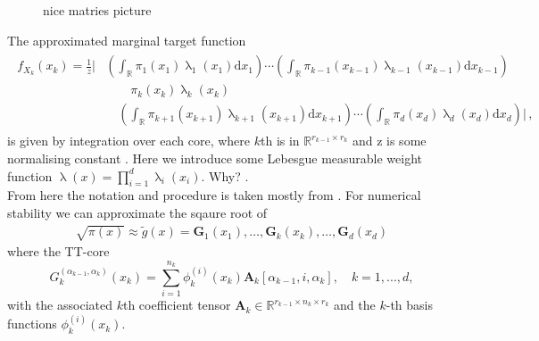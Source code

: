 \begin{figure}[ht!]
	\centering

	\caption{nice matries picture}
	\label{key}
	
\end{figure}


The approximated marginal target function
\begin{align}
	\begin{split}
	f_{X_k}(x_k) = \frac{1}{z}
	\Big|  &\left( \int_{\mathbb{R}} \pi_{1}(x_1) \uplambda_1(x_1)\text{d}x_{1} \right) \cdots \left( \int_{\mathbb{R}} \pi_{k-1}(x_{k-1}) \uplambda_{k-1}(x_{k-1}) \text{d}x_{k-1} \right) \\ & \qquad \pi_{k}(x_k)\uplambda_k(x_{k}) \\ &\quad \left( \int_{\mathbb{R}} \pi_{k+1}(x_{k+1})\uplambda_{k+1}(x_{k+1})\text{d}x_{k+1} \right) \cdots  \left( \int_{\mathbb{R}} \pi_{d}(x_d)\uplambda_d(x_{d})\text{d}x_d \right) \Big| \, ,
	\end{split} 
\end{align}
is given by integration over each core, where $k$th is in $\mathbb{R}^{r_{k-1} \times r_{k}}$ and z is some normalising constant \cite{dolgov2020approximation}.
Here we introduce some Lebesgue measurable weight function  $\uplambda(x) = \prod^d_{i=1} \uplambda_i(x_i)$.
Why? \cite{}.
\\


From here the notation and procedure is taken mostly from \cite{cui2022deep}.
For numerical stability we can approximate the sqaure root of
\begin{align}
	\sqrt{\pi(x)} \approx \tilde{g}(x) = \bm{G}_1(x_1), \dots ,  \bm{G}_k(x_k), \dots ,  \bm{G}_d(x_d)
\end{align}
where the TT-core
\begin{equation}
	G^{(\alpha_{k-1},\alpha_k)}_k(x_k) = \sum_{i=1}^{n_k} \phi^{(i)}_k(x_k) \bm{A}_k[\alpha_{k-1}, i, \alpha_k], \quad k = 1, ..., d,
\end{equation}
with the associated $k$th coefficient tensor $\bm{A}_k \in \mathbb{R}^{r_{k-1} \times n_k \times r_k}$ and the $k$-th  basis functions $\phi^{(i)}_k(x_k)$.

